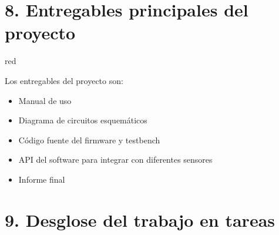 \documentclass[
11pt, %
codirector, %
]{charter}
\begin{document}
\section{8. Entregables principales del proyecto}
\label{sec:entregables}

\begin{consigna}{red}

Los entregables del proyecto son:

\begin{itemize}
	\item Manual de uso
	\item Diagrama de circuitos esquemáticos
	\item Código fuente del firmware y testbench
	\item API del software para integrar con diferentes sensores
	\item Informe final
\end{itemize}

\end{consigna}

\section{9. Desglose del trabajo en tareas}
\label{sec:wbs}
\end{document}
